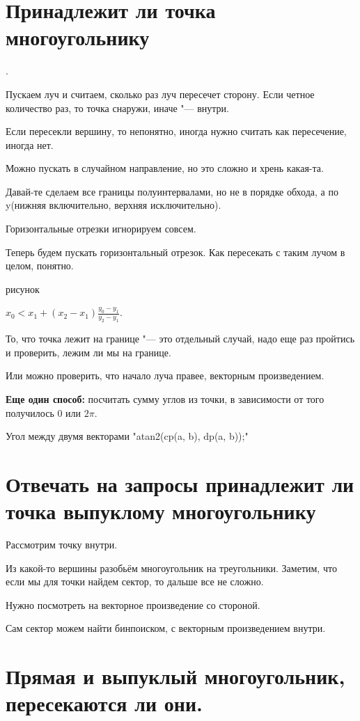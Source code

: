\section{Принадлежит ли точка многоугольнику}.

Пускаем луч и считаем, сколько раз луч пересечет сторону. Если четное количество раз, то точка снаружи, иначе "--- внутри.

Если пересекли вершину, то непонятно, иногда нужно считать как пересечение, иногда нет. 

Можно пускать в случайном направление, но это сложно и хрень какая-та. 

Давай-те сделаем все границы полуинтервалами, но не в порядке обхода, а по y(нижняя включительно, верхняя исключительно).

Горизонтальные отрезки игнорируем совсем. 

Теперь будем пускать горизонтальный отрезок. Как пересекать с таким лучом в целом, понятно.

{\color{red} рисунок}

$x_0 < x_1 + (x_2 - x_1)\frac{y_0 - y_1}{y_2 - y_1}$.

То, что точка лежит на границе "--- это отдельный случай, надо еще раз пройтись и проверить, лежим ли мы на границе.

Или можно проверить, что начало луча правее, векторным произведением.

\textbf{Еще один способ:} посчитать сумму углов из точки, в зависимости от того получилось 0 или $2\pi$.

Угол между двумя векторами \cpp"atan2(cp(a, b), dp(a, b));"

\section{Отвечать на запросы принадлежит ли точка выпуклому многоугольнику}

Рассмотрим точку внутри.

Из какой-то вершины разобьём многоугольник на треугольники. Заметим, что если мы для точки
найдем сектор, то дальше все не сложно.

Нужно посмотреть на векторное произведение со стороной.

Сам сектор можем найти бинпоиском, с векторным произведением внутри.

\section{Прямая и выпуклый многоугольник, пересекаются ли они.}

